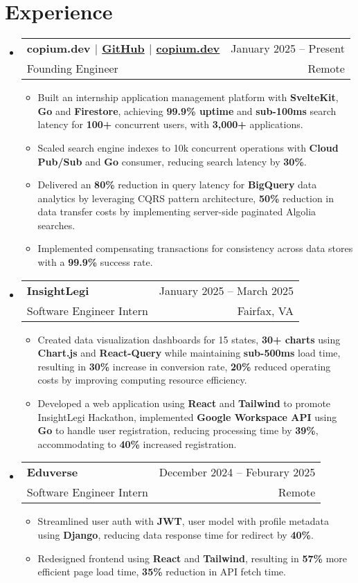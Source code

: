 \documentclass[letterpaper,11pt]{article}
\makeatletter
\newcommand{\resumeItem}[1]{
  \item\small{
    {#1 \vspace{3pt}}
  }
}
\newcommand{\resumeSubheading}[4]{
    \item
    \begin{tabular*}{0.985\textwidth}[t]{l@{\extracolsep{\fill}}r@{\hspace{-0.1in}}}
        \small{\textbf{#1}} & \small{#2} \\
        \small#3 & \small #4 \\
    \end{tabular*}\vspace{-3pt}
}
\newcommand{\resumeSubHeadingListStart}{\begin{itemize}[leftmargin=0.00in, rightmargin=-0.2in, label={}]\vspace{1pt}}
\newcommand{\resumeSubHeadingListEnd}{\end{itemize}\vspace{-10pt}}
\newcommand{\resumeItemListStart}{\begin{itemize}[leftmargin=0.15in, rightmargin=0.15in]}
\newcommand{\resumeItemListEnd}{\end{itemize}\vspace{-10pt}}
\makeatother
\begin{document}
\section{Experience}

\resumeSubHeadingListStart
\resumeSubheading
{copium.dev $|$ \textnormal{\href{https://github.com/copium-dev/copium}{GitHub}} $|$ \textnormal{\href{https://www.copium.dev}{copium.dev}}} {January 2025 -- Present}
{Founding Engineer} {Remote}
\resumeItemListStart 
\resumeItem{Built an internship application management platform with \textbf{SvelteKit}, \textbf{Go} and \textbf{Firestore}, achieving \textbf{99.9\% uptime} and \textbf{sub-100ms} search latency for \textbf{100+} concurrent users, with \textbf{3,000+} applications.}
\resumeItem{Scaled search engine indexes to 10k concurrent operations with \textbf{Cloud Pub/Sub} and \textbf{Go} consumer, reducing search latency by \textbf{30\%}.}
\resumeItem{Delivered an \textbf{80\%} reduction in query latency for \textbf{BigQuery} data analytics by leveraging CQRS pattern architecture, \textbf{50\%} reduction in data transfer costs by implementing server-side paginated Algolia searches.}
\resumeItem{Implemented compensating transactions for consistency across data stores with a \textbf{99.9\%} success rate.}
\resumeItemListEnd
\resumeSubHeadingListEnd

\resumeSubHeadingListStart
\resumeSubheading
{InsightLegi} {January 2025 -- March 2025}
{Software Engineer Intern} {Fairfax, VA}
\resumeItemListStart 
\resumeItem{Created data visualization dashboards for 15 states, \textbf{30+ charts} using \textbf{Chart.js} and \textbf{React-Query} while maintaining \textbf{sub-500ms} load time, resulting in \textbf{30\%} increase in conversion rate, \textbf{20\%} reduced operating costs by improving computing resource efficiency.}
\resumeItem{Developed a web application using \textbf{React} and \textbf{Tailwind} to promote InsightLegi Hackathon, implemented \textbf{Google Workspace API} using \textbf{Go} to handle user registration, reducing processing time by \textbf{39\%}, accommodating to \textbf{40\%} increased registration.}
\resumeItemListEnd
\resumeSubHeadingListEnd

\resumeSubHeadingListStart
\resumeSubheading
{Eduverse} {December 2024 -- Feburary 2025}
{Software Engineer Intern} {Remote}
\resumeItemListStart
\resumeItem{Streamlined user auth with \textbf{JWT}, user model with profile metadata using \textbf{Django}, reducing data response time for redirect by \textbf{40\%}.}
\resumeItem{Redesigned frontend using \textbf{React} and \textbf{Tailwind}, resulting in \textbf{57\%} more efficient page load time, \textbf{35\%} reduction in API fetch time.}
\resumeItemListEnd
\resumeSubHeadingListEnd
\end{document}
